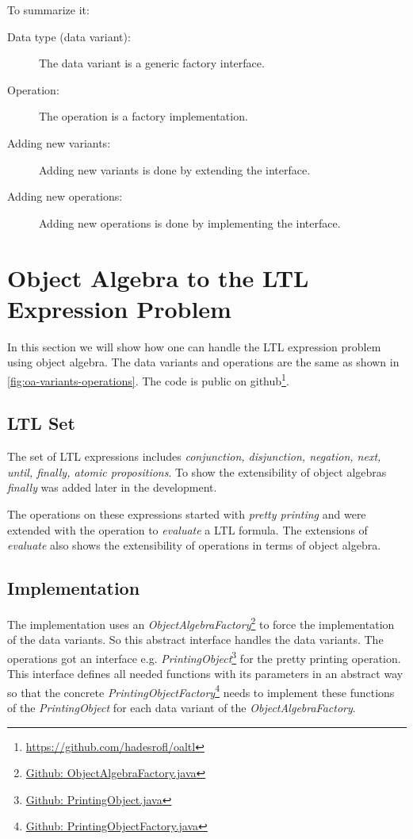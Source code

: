 \documentclass{llncs}
\begin{document}
To summarize it:

\begin{description}
	\item[Data type (data variant):] The data variant is a generic factory interface.
	\item[Operation:] The operation is a factory implementation.
	\item[Adding new variants: ] Adding new variants is done by extending the interface.
	\item[Adding new operations:] Adding new operations is done by implementing the interface.
\end{description}


\section{Object Algebra to the LTL Expression Problem} \label{sec:oa-ltl}
In this section we will show how one can handle the LTL expression problem using object algebra. The data variants and operations are the same as shown in \autoref{fig:oa-variants-operations}. The code is public on github\footnote{\href{https://github.com/hadesrofl/oaltl}{https://github.com/hadesrofl/oaltl}}.

\subsection{LTL Set} \label{ssec:ltl-set}
The set of LTL expressions includes \emph{conjunction, disjunction, negation, next, until, finally, atomic propositions}. To show the extensibility of object algebras \emph{finally} was added later in the development.

The operations on these expressions started with \emph{pretty printing} and were extended with the operation to \emph{evaluate} a LTL formula. The extensions of \emph{evaluate} also shows the extensibility of operations in terms of object algebra.

\subsection{Implementation} \label{ssec:implementation}
The implementation uses an \emph{ObjectAlgebraFactory}\footnote{\href{https://github.com/hadesrofl/oaltl/blob/develop/src/main/java/de/uzl/hsr/oaltl/ObjectAlgebraFactory.java}{Github: ObjectAlgebraFactory.java}} to force the implementation of the data variants. So this abstract interface handles the data variants. The operations got an interface e.g. \emph{PrintingObject}\footnote{\href{https://github.com/hadesrofl/oaltl/blob/develop/src/main/java/de/uzl/hsr/oaltl/PrintingObject.java}{Github: PrintingObject.java}} for the pretty printing operation. This interface defines all needed functions with its parameters in an abstract way so that the concrete \emph{PrintingObjectFactory}\footnote{\href{https://github.com/hadesrofl/oaltl/blob/develop/src/main/java/de/uzl/hsr/oaltl/PrintingObjectFactory.java}{Github: PrintingObjectFactory.java}} needs to implement these functions of the \emph{PrintingObject} for each data variant of the \emph{ObjectAlgebraFactory}. 
\end{document}
